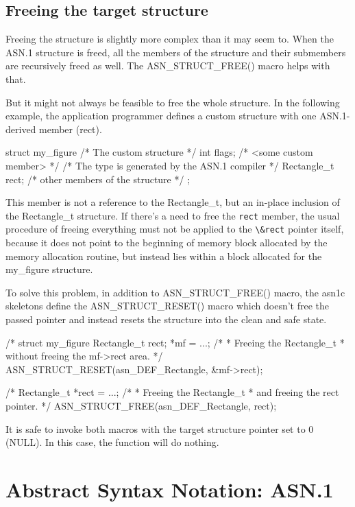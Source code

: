 \documentclass[english,oneside,12pt]{book}
\newcommand{\code}[1]{\lstinline{#1}}
\begin{document}
\section{\label{sec:Freeing-the-target}Freeing the target structure}

Freeing the structure is slightly more complex than it may seem to.
When the ASN.1 structure is freed, all the members of the structure
and their submembers are recursively freed as well.
The ASN\_STRUCT\_FREE() macro helps with that.

But it might not always be feasible to free the whole structure.
In the following example, the application programmer defines a custom
structure with one ASN.1-derived member (rect).
\begin{codesample}
struct my_figure {       /* The custom structure */
    int flags;           /* <some custom member> */
    /* The type is generated by the ASN.1 compiler */
    Rectangle_t rect;
    /* other members of the structure */
};
\end{codesample}
This member is not a reference to the Rectangle\_t, but an in-place inclusion
of the Rectangle\_t structure.
If there's a need to free the \code{rect} member, the usual procedure of
freeing everything must not be applied to the \code{\&rect} pointer itself,
because it does not point to the beginning of memory block allocated by
the memory allocation routine, but instead lies within a block allocated for
the my\_figure structure.

To solve this problem, in addition to ASN\_STRUCT\_FREE() macro, the asn1c
skeletons define the ASN\_STRUCT\_RESET() macro which doesn't free the passed
pointer and instead resets the structure into the clean and safe state.
\begin{codesample}
/* %
struct my_figure {
    Rectangle_t rect;
} *mf = ...;
/*
 * Freeing the Rectangle_t
 * without freeing the mf->rect area.
 */
ASN_STRUCT_RESET(asn_DEF_Rectangle, &mf->rect);
  
/* %
Rectangle_t *rect = ...;
/*
 * Freeing the Rectangle_t
 * and freeing the rect pointer.
 */
ASN_STRUCT_FREE(asn_DEF_Rectangle, rect);
\end{codesample}
It is safe to invoke both macros with the target structure pointer
set to 0 (NULL). In this case, the function will do nothing.

\chapter{\label{chap:Abstract-Syntax-Notation}Abstract Syntax Notation: ASN.1}
\end{document}
